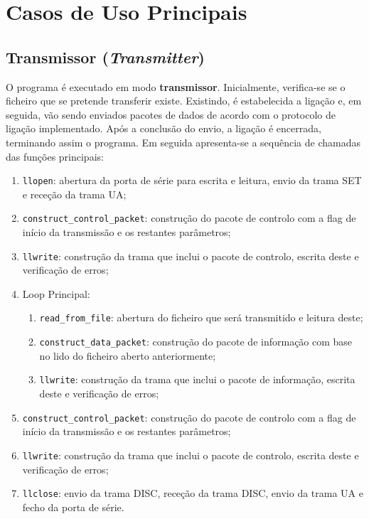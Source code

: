 \documentclass[article, a4paper, 11pt, oneside]{memoir}
\begin{document}
\chapter[Casos de Uso Principais][Casos de Uso Principais]{Casos de Uso Principais} \label{\thechapter}

\section{Transmissor (\textit{Transmitter})}

O programa é executado em modo \textbf{transmissor}. Inicialmente, verifica-se se o ficheiro que
se pretende transferir existe. Existindo, é estabelecida a ligação e, em seguida, vão sendo enviados pacotes
de dados de acordo com o protocolo de ligação implementado. Após a conclusão do envio, a ligação
é encerrada, terminando assim o programa. Em seguida apresenta-se a sequência de chamadas das 
funções principais:
\begin{enumerate}
    \item \verb|llopen|: abertura da porta de série para escrita e leitura, envio da trama SET e 
    receção da trama UA;
    \item \verb|construct_control_packet|: construção do pacote de controlo com a flag de início
    da transmissão e os restantes parâmetros;
    \item \verb|llwrite|: construção da trama que inclui o pacote de controlo, escrita deste e
    verificação de erros;
    \item Loop Principal:
    \begin{enumerate}
        \item \verb|read_from_file|: abertura do ficheiro que será transmitido e leitura deste;
        \item \verb|construct_data_packet|: construção do pacote de informação com base no lido
        do ficheiro aberto anteriormente;
        \item \verb|llwrite|: construção da trama que inclui o pacote de informação, escrita deste e
        verificação de erros;
    \end{enumerate}    
    \item \verb|construct_control_packet|: construção do pacote de controlo com a flag de início
    da transmissão e os restantes parâmetros;
    \item \verb|llwrite|: construção da trama que inclui o pacote de controlo, escrita deste e
    verificação de erros;
    \item \verb|llclose|: envio da trama DISC, receção da trama DISC, envio da trama UA
    e fecho da porta de série.
\end{enumerate}
\end{document}
